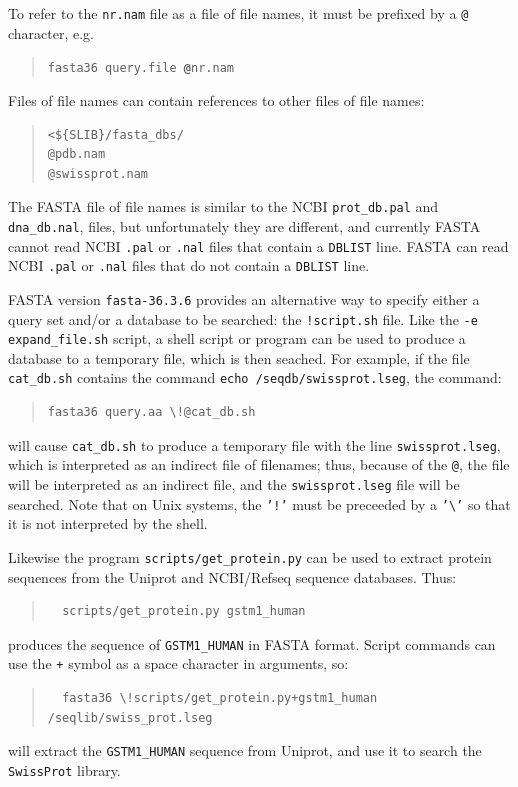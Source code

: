 \documentclass[11pt]{article}
\begin{document}
To refer to the \texttt{nr.nam} file as a file of file names, it must
be prefixed by a \texttt{@} character, e.g.
\begin{quote}
\texttt{fasta36 query.file \textbf{@}nr.nam}
\end{quote}
Files of file names can contain references to other files of file names:
\begin{quote}
\begin{verbatim}
<${SLIB}/fasta_dbs/
@pdb.nam
@swissprot.nam
\end{verbatim}
\end{quote}
The FASTA file of file names is similar to the NCBI
\texttt{prot\_db.pal} and \texttt{dna\_db.nal}, files, but
unfortunately they are different, and currently FASTA cannot read NCBI
\texttt{.pal} or \texttt{.nal} files that contain a \texttt{DBLIST}
line. FASTA can read NCBI \texttt{.pal} or \texttt{.nal} files that do
not contain a \texttt{DBLIST} line.

FASTA version \texttt{fasta-36.3.6} provides an alternative way to
specify either a query set and/or a database to be searched: the \texttt{!script.sh} file.
Like the \texttt{-e expand\_file.sh} script, a shell script or program
can be used to produce a database to a temporary file, which is then
seached.  For example, if the file \texttt{cat\_db.sh} contains the
command \texttt{echo /seqdb/swissprot.lseg}, the command:
\begin{quote}
\begin{verbatim}
fasta36 query.aa \!@cat_db.sh
\end{verbatim}
\end{quote}
will cause \texttt{cat\_db.sh} to produce a temporary file with the
line \texttt{swissprot.lseg}, which is interpreted as an indirect file
of filenames; thus, because of the \texttt{@}, the file will be
interpreted as an indirect file, and the \texttt{swissprot.lseg} file
will be searched.  Note that on Unix systems, the \texttt{'!'} must be
preceeded by a \texttt{'\textbackslash'} so that it is not interpreted by the
shell.

Likewise the program \texttt{scripts/get\_protein.py} can be used to
extract protein sequences from the Uniprot and NCBI/Refseq sequence
databases.  Thus:
\begin{quote}
\begin{verbatim}
  scripts/get_protein.py gstm1_human
\end{verbatim}
\end{quote}
produces the sequence of \texttt{GSTM1\_HUMAN} in FASTA format.
Script commands can use the \texttt{+} symbol as a space character in arguments, so:
\begin{quote}
\begin{verbatim}
  fasta36 \!scripts/get_protein.py+gstm1_human /seqlib/swiss_prot.lseg
\end{verbatim}
\end{quote}
will extract the \texttt{GSTM1\_HUMAN} sequence from Uniprot, and use it to search the \texttt{SwissProt} library.
\end{document}
